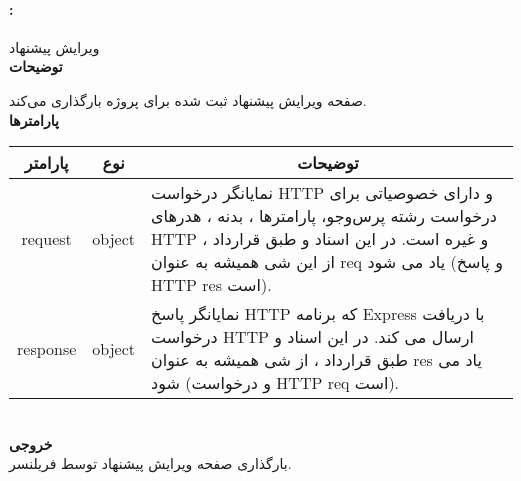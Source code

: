 \paragraph{:}
ویرایش پیشنهاد ‌ 
\\
\textbf{توضیحات}
\hr
\begin{flushleft}
	\framebox[.9\textwidth][l]{
		\lr{
			\textcolor{type}{void}
			\textcolor{func}{getEditRequest}
			\textcolor{symb}{(}
			\textcolor{type}{object}
			\textcolor{arg}{request}
			\textcolor{symb}{,}
			\textcolor{type}{object}
			\textcolor{arg}{response}
			\textcolor{symb}{);}
		}
	}
\end{flushleft}
 صفحه ویرایش پیشنهاد ثبت شده برای پروژه بارگذاری می‌کند.
\\
\textbf{پارامترها}
\hr \\[10pt]
\begin{tabular}{|m{4cm}|m{3cm}|m{10cm}|}
	\hline
	\multicolumn{1}{|c}{پارامتر}
	&
	\multicolumn{1}{|c}{نوع}
	&
	\multicolumn{1}{|c|}{توضیحات}
	\\
	\hline
	\multicolumn{1}{|c}{request}
	&
	\multicolumn{1}{|c|}{object}
	&
	نمایانگر درخواست HTTP و دارای خصوصیاتی برای درخواست رشته پرس‌و‌جو، پارامترها ، بدنه ، هدرهای HTTP و غیره است.
	در این اسناد و طبق قرارداد ، از این شی همیشه به عنوان req یاد می شود (و پاسخ HTTP res است).
	\\
	\hline
	\multicolumn{1}{|c}{response}
	&
	\multicolumn{1}{|c|}{object}
	&
	نمایانگر پاسخ HTTP که برنامه Express با دریافت درخواست HTTP ارسال می کند.
	در این اسناد و طبق قرارداد ، از شی همیشه به عنوان res یاد می شود (و درخواست HTTP req است).
	\\
	\hline
\end{tabular}
\\[10pt]
\textbf{خروجی}
\hr \\
بارگذاری صفحه ویرایش پیشنهاد توسط فریلنسر.

